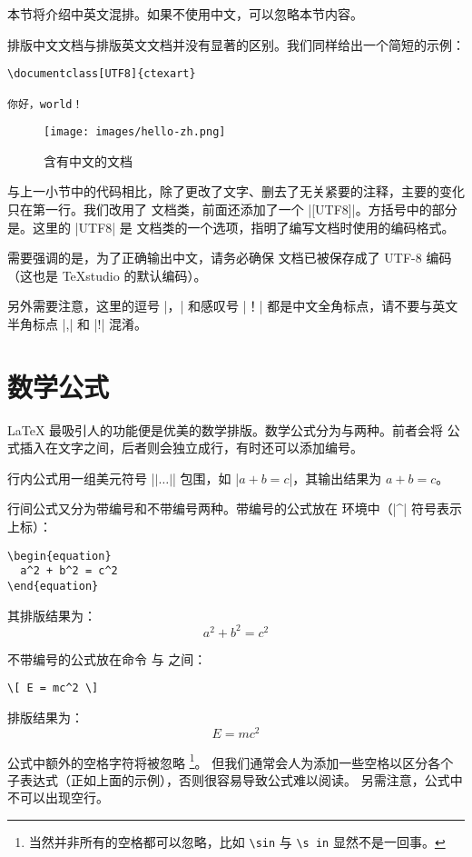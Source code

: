 本节将介绍中英文混排。如果不使用中文，可以忽略本节内容。

排版中文文档与排版英文文档并没有显著的区别。我们同样给出一个简短的示例：

\begin{verbatim}
\documentclass[UTF8]{ctexart}

你好，world！

\end{verbatim}

\begin{figure}[htb]
  \texttt{[image: images/hello-zh.png]}
  \caption{含有中文的文档 }
  \label{fig:hello-zh}
\end{figure}

与上一小节中的代码相比，除了更改了文字、删去了无关紧要的注释，主要的变化只在第一行。我们改用了
 文档类，前面还添加了一个 |[UTF8]|。方括号中的部分是。这里的 |UTF8| 是
 文档类的一个选项，指明了编写文档时使用的编码格式。

需要强调的是，为了正确输出中文，请务必确保  文档已被保存成了 UTF-8 编码（这也是
TeXstudio 的默认编码）。

另外需要注意，这里的逗号 |，| 和感叹号 |！| 都是中文全角标点，请不要与英文半角标点 |,| 和 |!| 混淆。

\section{数学公式}

\LaTeX{} 最吸引人的功能便是优美的数学排版。数学公式分为与两种。前者会将
公式插入在文字之间，后者则会独立成行，有时还可以添加编号。

行内公式用一组美元符号 |$|\ldots|$| 包围，如 |$a+b=c$|，其输出结果为 $a+b=c$。

行间公式又分为带编号和不带编号两种。带编号的公式放在  环境中（|^| 符号表示上标）：

\begin{verbatim}
\begin{equation}
  a^2 + b^2 = c^2
\end{equation}
\end{verbatim}

其排版结果为：
\begin{equation}
  a^2 + b^2 = c^2
\end{equation}

不带编号的公式放在命令 \cs{[} 与 \cs{]}之间：

\begin{verbatim}
\[ E = mc^2 \]
\end{verbatim}

排版结果为：
\[ E = mc^2 \]

公式中额外的空格字符将被忽略
\footnote{当然并非所有的空格都可以忽略，比如 \verb|\sin| 与 \verb|\s in| 显然不是一回事。}。
但我们通常会人为添加一些空格以区分各个子表达式（正如上面的示例），否则很容易导致公式难以阅读。
另需注意，公式中不可以出现空行。
